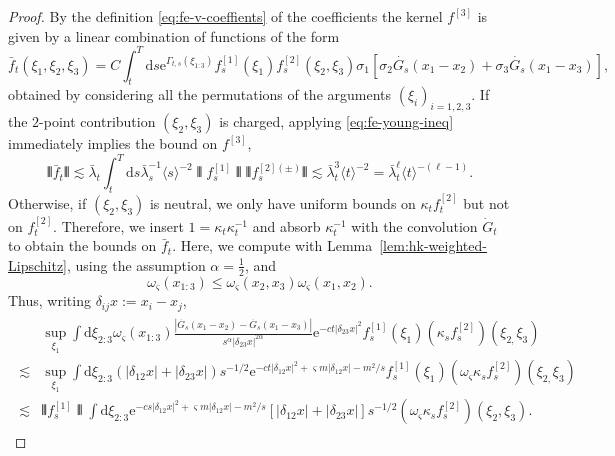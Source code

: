 \documentclass[11pt, a4paper]{scrartcl}
\numberwithin{equation}{section}
\theoremstyle{plain}
\theoremstyle{remark}
\newcommand{\assign}{:=}
\newcommand{\mathd}{\mathrm{d}}
\newcommand{\mathe}{\mathrm{e}}
\begin{document}
\begin{proof}
	By the definition \eqref{eq:fe-v-coeffients} of the coefficients the kernel
	$f^{[3]}$ is given by a linear combination of functions of the form
	\[ \bar{f}_t (\xi_1, \xi_2, \xi_3) = C \int_t^T \mathd s \mathe^{\Gamma_{t, s}
			(\xi_{1 : 3})} f^{[1]}_s (\xi_1) f^{[2]}_s (\xi_2, \xi_3) \sigma_1
		[\sigma_2 \dot{G_s} (x_1 - x_2) + \sigma_3 \dot{G_s} (x_1 - x_3)],\]
	obtained by considering all the permutations of the arguments $(\xi_i)_{i =
				1, 2, 3}$. If the $2$-point contribution $(\xi_2, \xi_3)$ is charged,
	applying \eqref{eq:fe-young-ineq} immediately implies the bound on
	$f^{[3]}$,
	\[ \interleave \bar{f}_t \interleave \lesssim \bar{\lambda}_t  \int_t^T \mathd s
		\bar{\lambda}_s^{- 1} \langle s \rangle^{- 2} \interleave f_s^{[1]} \interleave
		\interleave f_s^{[2] (\pm)} \interleave \lesssim \bar{\lambda}_t^3 \langle t
		\rangle^{- 2} = \bar{\lambda}_t^{\ell} \langle t \rangle^{- (\ell - 1)} . \]
	Otherwise, if $(\xi_2, \xi_3)$ is neutral, we only have uniform bounds on
	$\kappa_t f_t^{[2]}$ but not on $f^{[2]}_t$. Therefore, we insert $1 = \kappa_t \kappa_t^{-
			1}$ and absorb $\kappa_t^{- 1}$ with the convolution $\dot{G}_t$ to obtain the
	bounds on $\bar{f}_t$. Here, we compute with
	Lemma~\ref{lem:hk-weighted-Lipschitz}, using the assumption $\alpha =
		\frac{1}{2}$, and
	\[ \omega_{\varsigma} (x_{1 : 3}) \leqslant \omega_{\varsigma} (x_2, x_3)
		\omega_{\varsigma} (x_1, x_2) . \]
	Thus, writing $\delta_{i j} x \assign x_i - x_j$,
	\begin{align}
		\begin{split}
			         & \sup_{\xi_1}  \int \mathd \xi_{2 : 3} \omega_{\varsigma} (x_{1 : 3})
			\frac{| \dot{G_s} (x_1 - x_2) - \dot{G_s} (x_1 - x_3) |}{s^{\alpha} |
				\delta_{23} x |^{2 \alpha}} \mathe^{- ct | \delta_{23} x |^2} f_s^{[1]}
			(\xi_1) (\kappa_s f_s^{[2]}) (\xi_{2,} \xi_3)                                   \\
			\lesssim & \sup_{\xi_1}  \int \mathd \xi_{2 : 3} (| \delta_{12} x | + |
			\delta_{23} x |) s^{- 1 / 2} \mathe^{- ct | \delta_{12} x |^2 +
				\varsigma m | \delta_{12} x | - m^2 / s} f_s^{[1]} (\xi_1)
			(\omega_{\varsigma} \kappa_s f_s^{[2]}) (\xi_{2,} \xi_3)                        \\
			\lesssim & \interleave f_s^{[1]} \interleave  \int \mathd \xi_{2 : 3}
			\mathe^{- cs | \delta_{12} x |^2 + \varsigma m | \delta_{12} x | - m^2 /
				s} [| \delta_{12} x | + | \delta_{23} x |] s^{- 1 / 2} (\omega_{\varsigma}\kappa_s f^{[2]}_s)
			(\xi_2, \xi_3).\label{eq:dg-dx}

\end{split}
\end{align}
\end{proof}
\end{document}
